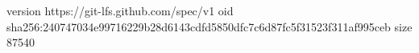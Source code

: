 version https://git-lfs.github.com/spec/v1
oid sha256:240747034e99716229b28d6143cdfd5850dfc7c6d87fc5f31523f311af995ceb
size 87540
